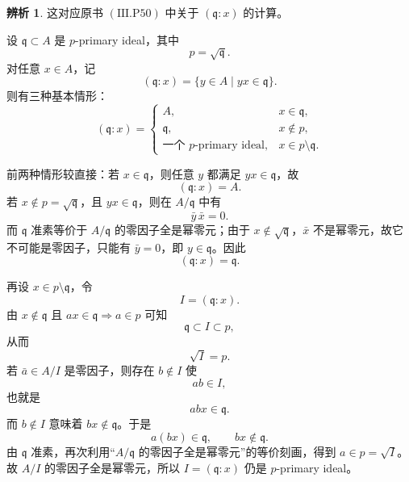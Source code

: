 \documentclass[a4paper]{ctexart}
\theoremstyle{definition}
\theoremstyle{analysis}
\newtheorem{remark}{辨析}[section]
\theoremstyle{plain}
\begin{document}
\label{rem:primary-colon}
\begin{remark}
这对应原书 \((\mathrm{III.P50})\) 中关于 \((\mathfrak q:x)\) 的计算。

设 \(\mathfrak q\subset A\) 是 \(p\)-primary ideal，其中
\[
  p=\sqrt{\mathfrak q}.
\]
对任意 \(x\in A\)，记
\[
  (\mathfrak q:x)=\{y\in A\mid yx\in \mathfrak q\}.
\]
则有三种基本情形：
\[
  (\mathfrak q:x)=
  \begin{cases}
    A, & x\in \mathfrak q,\\
    \mathfrak q, & x\notin p,\\
    \text{一个 } p\text{-primary ideal}, & x\in p\setminus \mathfrak q.
  \end{cases}
\]

前两种情形较直接：若 \(x\in \mathfrak q\)，则任意 \(y\) 都满足 \(yx\in \mathfrak q\)，故
\[
  (\mathfrak q:x)=A.
\]
若 \(x\notin p=\sqrt{\mathfrak q}\)，且 \(yx\in \mathfrak q\)，则在 \(A/\mathfrak q\) 中有
\[
  \bar y\,\bar x=0.
\]
而 \(\mathfrak q\) 准素等价于 \(A/\mathfrak q\) 的零因子全是幂零元；由于 \(x\notin \sqrt{\mathfrak q}\)，\(\bar x\) 不是幂零元，故它不可能是零因子，只能有 \(\bar y=0\)，即 \(y\in \mathfrak q\)。因此
\[
  (\mathfrak q:x)=\mathfrak q.
\]

再设 \(x\in p\setminus \mathfrak q\)，令
\[
  I=(\mathfrak q:x).
\]
由 \(x\notin \mathfrak q\) 且 \(ax\in \mathfrak q\Rightarrow a\in p\) 可知
\[
  \mathfrak q\subset I\subset p,
\]
从而
\[
  \sqrt{I}=p.
\]
若 \(\bar a\in A/I\) 是零因子，则存在 \(b\notin I\) 使
\[
  ab\in I,
\]
也就是
\[
  abx\in \mathfrak q.
\]
而 \(b\notin I\) 意味着 \(bx\notin \mathfrak q\)。于是
\[
  a(bx)\in \mathfrak q,\qquad bx\notin \mathfrak q.
\]
由 \(\mathfrak q\) 准素，再次利用“\(A/\mathfrak q\) 的零因子全是幂零元”的等价刻画，得到 \(a\in p=\sqrt{I}\)。故 \(A/I\) 的零因子全是幂零元，所以 \(I=(\mathfrak q:x)\) 仍是 \(p\)-primary ideal。
\end{remark}
\end{document}
